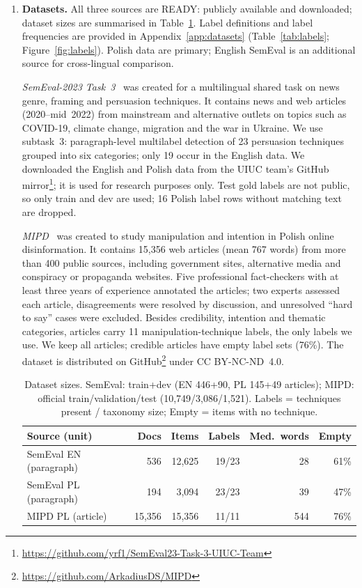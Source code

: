 \documentclass[11pt]{article}
\begin{document}
\begin{enumerate}
\item \textbf{Datasets.}
All three sources are READY: publicly available and downloaded; dataset sizes are summarised in Table~\ref{tab:datasets}. Label definitions and label frequencies are provided in Appendix~\ref{app:datasets} (Table~\ref{tab:labels}; Figure~\ref{fig:labels}). Polish data are primary; English SemEval is an additional source for cross-lingual comparison.

\textit{SemEval-2023 Task~3}~\cite{piskorski-etal-2023-semeval} was created for a multilingual shared task on news genre, framing and persuasion techniques. It contains news and web articles (2020--mid~2022) from mainstream and alternative outlets on topics such as COVID-19, climate change, migration and the war in Ukraine. We use subtask~3: paragraph-level multilabel detection of 23 persuasion techniques grouped into six categories; only 19 occur in the English data. We downloaded the English and Polish data from the UIUC team's GitHub mirror\footnote{\url{https://github.com/yrf1/SemEval23-Task-3-UIUC-Team}}; it is used for research purposes only. Test gold labels are not public, so only train and dev are used; 16 Polish label rows without matching text are dropped.

\textit{MIPD}~\cite{modzelewski-etal-2024-mipd} was created to study manipulation and intention in Polish online disinformation. It contains 15,356 web articles (mean 767 words) from more than 400 public sources, including government sites, alternative media and conspiracy or propaganda websites. Five professional fact-checkers with at least three years of experience annotated the articles; two experts assessed each article, disagreements were resolved by discussion, and unresolved ``hard to say'' cases were excluded. Besides credibility, intention and thematic categories, articles carry 11 manipulation-technique labels, the only labels we use. We keep all articles; credible articles have empty label sets (76\%). The dataset is distributed on GitHub\footnote{\url{https://github.com/ArkadiusDS/MIPD}} under CC BY-NC-ND~4.0.

\begin{table}[H]
\centering
\scriptsize
\setlength{\tabcolsep}{3pt}
\begin{tabular}{@{}lrrrrr@{}}
\hline
Source (unit) & Docs & Items & Labels & Med.\ words & Empty \\
\hline
SemEval EN (paragraph) & 536 & 12,625 & 19/23 & 28 & 61\% \\
SemEval PL (paragraph) & 194 & 3,094 & 23/23 & 39 & 47\% \\
MIPD PL (article) & 15,356 & 15,356 & 11/11 & 544 & 76\% \\
\hline
\end{tabular}
\caption{Dataset sizes. SemEval: train+dev (EN 446+90, PL 145+49 articles); MIPD: official train/validation/test (10,749/3,086/1,521). Labels = techniques present / taxonomy size; Empty = items with no technique.}
\label{tab:datasets}
\end{table}


\end{enumerate}
\end{document}
